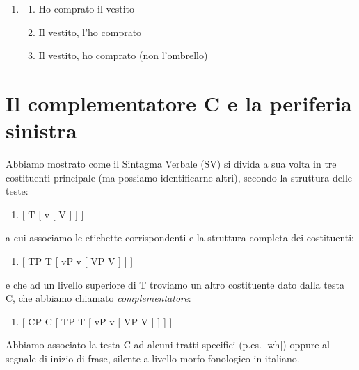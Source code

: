 \documentclass[
  a4paper,
  twoside,
  11pt,
  chapterprefix=false,
  bibliography=totocnumbered,
  listof=flat]{scrbook}
\providecommand{\tightlist}{%
  \setlength{\itemsep}{0pt}\setlength{\parskip}{0pt}}
\begin{document}
\begin{enumerate}
\def\labelenumi{(\arabic{enumi})}
\setcounter{enumi}{158}
\item
  \begin{enumerate}
  \def\labelenumii{\alph{enumii}.}
  \tightlist
  \item
    Ho comprato il vestito
  \item
    Il vestito, l'ho comprato
  \item
    Il vestito, ho comprato (non l'ombrello)
  \end{enumerate}
\end{enumerate}

\hypertarget{il-complementatore-c-e-la-periferia-sinistra}{%
\section{Il complementatore C e la periferia sinistra}\label{il-complementatore-c-e-la-periferia-sinistra}}

Abbiamo mostrato come il Sintagma Verbale (SV) si divida a sua volta in tre costituenti principale (ma possiamo identificarne altri), secondo la struttura delle teste:

\begin{enumerate}
\def\labelenumi{(\arabic{enumi})}
\setcounter{enumi}{159}
\tightlist
\item
  {[} T {[} v {[} V {]} {]} {]}
\end{enumerate}

a cui associamo le etichette corrispondenti e la struttura completa dei costituenti:

\begin{enumerate}
\def\labelenumi{(\arabic{enumi})}
\setcounter{enumi}{160}
\tightlist
\item
  {[} TP T {[} vP v {[} VP V {]} {]} {]}
\end{enumerate}

e che ad un livello superiore di T troviamo un altro costituente dato dalla testa C, che abbiamo chiamato \emph{complementatore}:

\begin{enumerate}
\def\labelenumi{(\arabic{enumi})}
\setcounter{enumi}{161}
\tightlist
\item
  {[} CP C {[} TP T {[} vP v {[} VP V {]} {]} {]} {]}
\end{enumerate}

Abbiamo associato la testa C ad alcuni tratti specifici (p.es. {[}wh{]}) oppure al segnale di inizio di frase, silente a livello morfo-fonologico in italiano.
\end{document}
